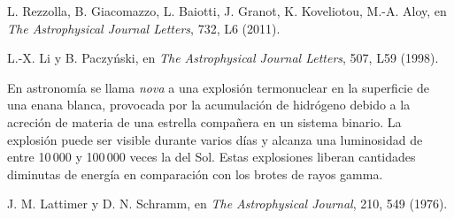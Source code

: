 \begin{description}[style=multiline,leftmargin=2em,labelwidth=1.5em]
\item[13.]\hypertarget{note:08-13}{}L. Rezzolla, B. Giacomazzo, L. Baiotti, J. Granot, K. Koveliotou, M.-A. Aloy, en \emph{The Astrophysical Journal Letters}, 732, L6 (2011).

\item[14.]\hypertarget{note:08-14}{}L.-X. Li y B. Paczyński, en \emph{The Astrophysical Journal Letters}, 507, L59 (1998).

\item[15.]\hypertarget{note:08-15}{}En astronomía se llama \emph{nova} a una explosión termonuclear en la superficie de una enana blanca, provocada por la acumulación de hidrógeno debido a la acreción de materia de una estrella compañera en un sistema binario. La explosión puede ser visible durante varios días y alcanza una luminosidad de entre 10\,000 y 100\,000 veces la del Sol. Estas explosiones liberan cantidades diminutas de energía en comparación con los brotes de rayos gamma.

\item[16.]\hypertarget{note:08-16}{}J. M. Lattimer y D. N. Schramm, en \emph{The Astrophysical Journal}, 210, 549 (1976).

\end{description}
